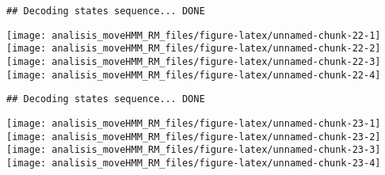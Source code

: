 \documentclass[
]{article}
\newenvironment{Shaded}{\begin{snugshade}}{\end{snugshade}}
\newcommand{\AttributeTok}[1]{\textcolor[rgb]{0.77,0.63,0.00}{#1}}
\newcommand{\ConstantTok}[1]{\textcolor[rgb]{0.00,0.00,0.00}{#1}}
\newcommand{\DecValTok}[1]{\textcolor[rgb]{0.00,0.00,0.81}{#1}}
\newcommand{\FloatTok}[1]{\textcolor[rgb]{0.00,0.00,0.81}{#1}}
\newcommand{\FunctionTok}[1]{\textcolor[rgb]{0.00,0.00,0.00}{#1}}
\newcommand{\NormalTok}[1]{#1}
\newcommand{\SpecialCharTok}[1]{\textcolor[rgb]{0.00,0.00,0.00}{#1}}
\newcommand{\StringTok}[1]{\textcolor[rgb]{0.31,0.60,0.02}{#1}}
\begin{document}
\begin{verbatim}
## Decoding states sequence... DONE
\end{verbatim}

\texttt{[image: analisis\_moveHMM\_RM\_files/figure-latex/unnamed-chunk-22-1]}
\texttt{[image: analisis\_moveHMM\_RM\_files/figure-latex/unnamed-chunk-22-2]}
\texttt{[image: analisis\_moveHMM\_RM\_files/figure-latex/unnamed-chunk-22-3]}
\texttt{[image: analisis\_moveHMM\_RM\_files/figure-latex/unnamed-chunk-22-4]}

\begin{Shaded}
\end{Shaded}

\begin{verbatim}
## Decoding states sequence... DONE
\end{verbatim}

\texttt{[image: analisis\_moveHMM\_RM\_files/figure-latex/unnamed-chunk-23-1]}
\texttt{[image: analisis\_moveHMM\_RM\_files/figure-latex/unnamed-chunk-23-2]}
\texttt{[image: analisis\_moveHMM\_RM\_files/figure-latex/unnamed-chunk-23-3]}
\texttt{[image: analisis\_moveHMM\_RM\_files/figure-latex/unnamed-chunk-23-4]}

\begin{Shaded}
\end{Shaded}
\end{document}
